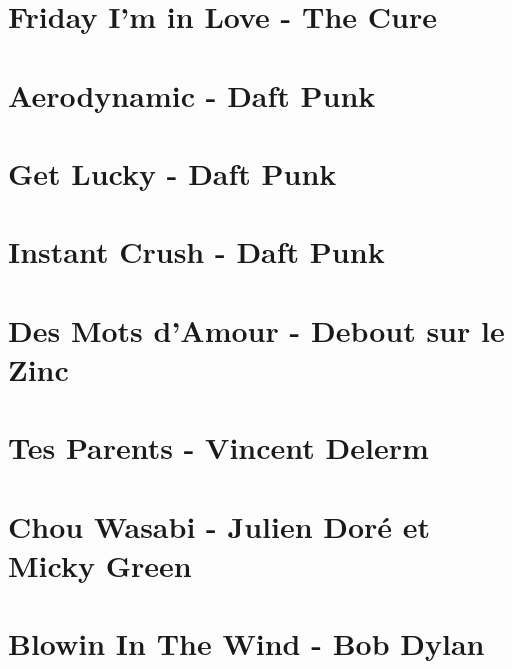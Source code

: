 \documentclass[11pt]{article}
\begin{document}
\section{Friday I'm in Love - The Cure}
\begin{guitar}

\end{guitar}


\section{Aerodynamic - Daft Punk}


\section{Get Lucky - Daft Punk}




\section{Instant Crush - Daft Punk}
\begin{guitar}

\end{guitar}

\section{Des Mots d'Amour - Debout sur le Zinc}


\section{Tes Parents - Vincent Delerm}


\section{Chou Wasabi - Julien Doré et Micky Green}
\begin{guitar}

\end{guitar}


\section{Blowin In The Wind - Bob Dylan}
\begin{guitar}

\end{guitar}
\end{document}
